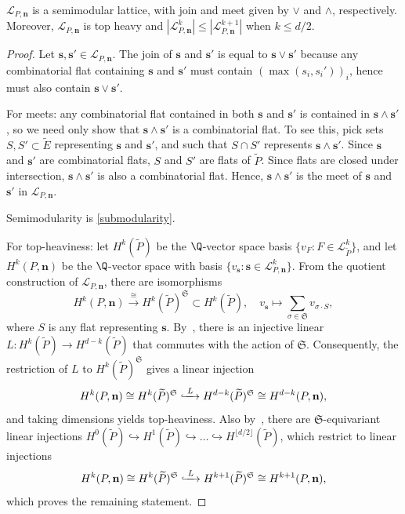 \begin{lemm}\label{lattice}
  $\mathcal L_{P, \mathbf n}$ is a semimodular lattice, with join and meet given by $\vee$ and $\wedge$, respectively. Moreover, $\mathcal L_{P, \mathbf n}$ is top heavy and $|\mathcal L_{P, \mathbf{n}}^k| \leq | \mathcal L_{P, \mathbf n}^{k+1}|$ when $k \leq d/2$.
\end{lemm}
\begin{proof}
  Let $\mathbf s, \mathbf s' \in \mathcal L_{P, \mathbf n}$.
  The join of $\mathbf s$ and $\mathbf s'$ is equal to $\mathbf s \vee \mathbf s'$ because any combinatorial flat containing $\mathbf s$ and $\mathbf s'$ must contain $(\max(s_i, s_i'))_i$, hence must also contain $\mathbf s \vee \mathbf s'$.

  For meets: any combinatorial flat contained in both $\mathbf s$ and $\mathbf s'$ is contained in $\mathbf s \wedge \mathbf s'$, so we need only show that $\mathbf s \wedge \mathbf s'$ is a combinatorial flat.
  To see this, pick sets $S, S' \subset \widetilde E$ representing $\mathbf s$ and $\mathbf s'$, and such that $S \cap S'$ represents $\mathbf s \wedge \mathbf s'$. Since $\mathbf s$ and $\mathbf s'$ are combinatorial flats, $S$ and $S'$ are flats of $\widetilde P$.
  Since flats are closed under intersection, $\mathbf s \wedge \mathbf s'$ is also a combinatorial flat.
  Hence, $\mathbf s \wedge \mathbf s'$ is the meet of $\mathbf s$ and $\mathbf s'$ in $\mathcal L_{P, \mathbf n}$.

  Semimodularity is \cref{submodularity}.

  For top-heaviness:
  let $H^k(\widetilde P)$ be the $\Q$-vector space basis $\{v_F : F \in \mathcal L_{\widetilde P}^k\}$, and let
  $H^k(P, \mathbf n)$ be the $\Q$-vector space with basis $\{v_{\mathbf s} : \mathbf s \in \mathcal L_{P, \mathbf n}^k\}$.
  From the quotient construction of $\mathcal L_{P, \mathbf n}$, there are isomorphisms
  \[
    H^k(P, \mathbf n) \overset{\cong}{\to} H^k(\widetilde P)^{\mathfrak S} \subset H^k(\widetilde P), \quad v_{\mathbf s} \mapsto \sum_{\sigma \in \mathfrak S} v_{\sigma \cdot S},
  \]
  where $S$ is any flat representing $\mathbf s$.
  By~\cite[Theorem 1.1]{BHMPW20b}, there is an injective linear $L: H^k(\widetilde P) \to H^{d-k}(\widetilde P)$ that commutes with the action of $\mathfrak S$. Consequently, the restriction of $L$ to $H^k(\widetilde P)^{\mathfrak S}$ gives a linear injection
  \[
    H^k(P, \mathbf n) \cong H^k(\widetilde P)^{\mathfrak S} \lhook\joinrel\xrightarrow{\;L\;} H^{d-k}(\widetilde P)^{\mathfrak S} \cong H^{d-k}(P, \mathbf n),
  \]
  and taking dimensions yields top-heaviness.
  Also by~\cite[Theorem 1.1]{BHMPW20b}, there are $\mathfrak S$-equivariant linear injections $H^0(\widetilde P) \hookrightarrow H^{1}(\widetilde P) \hookrightarrow \ldots \hookrightarrow H^{\lfloor d/2 \rfloor}(\widetilde P)$, which restrict to linear injections
  \[
    H^k(P, \mathbf n) \cong H^k(\widetilde P)^{\mathfrak S} \lhook\joinrel\xrightarrow{\;L\;} H^{k+1}(\widetilde P)^{\mathfrak S} \cong H^{k+1}(P, \mathbf n),
  \]
  which proves the remaining statement.
\end{proof}
